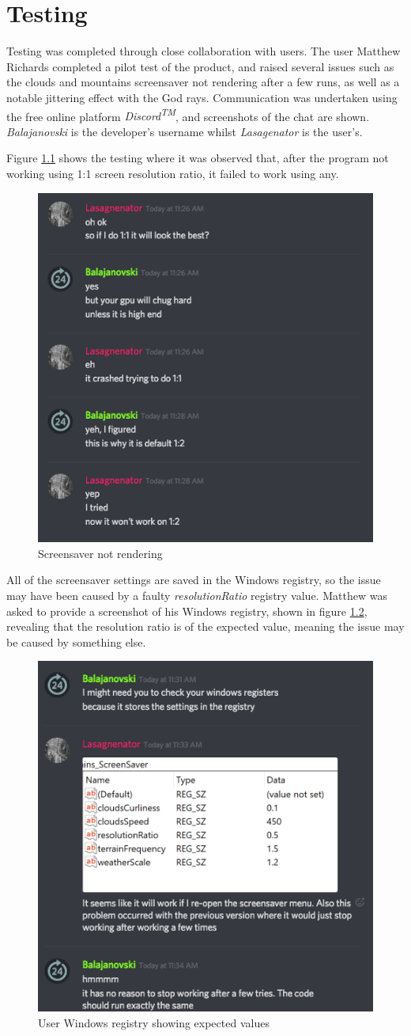 \documentclass[10pt, openany]{book}
\begin{document}
\chapter{Testing}

Testing was completed through close collaboration with users. The user Matthew Richards completed a pilot test of the product, and raised several issues such as the clouds and mountains screensaver not rendering after a few runs, as well as a notable jittering effect with the God rays. Communication was undertaken using the free online platform \textit{Discord\textsuperscript{TM}}, and screenshots of the chat are shown. \textit{Balajanovski} is the developer's username whilst \textit{Lasagenator} is the user's.

Figure \ref{fig:not-working} shows the testing where it was observed that, after the program not working using 1:1 screen resolution ratio, it failed to work using any.

\begin{figure}[H]
	\centering
	\includegraphics[width=0.5\linewidth]{testing1}
	\caption{Screensaver not rendering}
	\label{fig:not-working}
\end{figure}

All of the screensaver settings are saved in the Windows registry, so the issue may have been caused by a faulty \textit{resolutionRatio} registry value. Matthew was asked to provide a screenshot of his Windows registry, shown in figure \ref{fig:registry}, revealing that the resolution ratio is of the expected value, meaning the issue may be caused by something else.

\begin{figure}[H]
	\centering
	\includegraphics[width=0.5\linewidth]{testing2}
	\caption{User Windows registry showing expected values}
	\label{fig:registry}
\end{figure}
\end{document}
